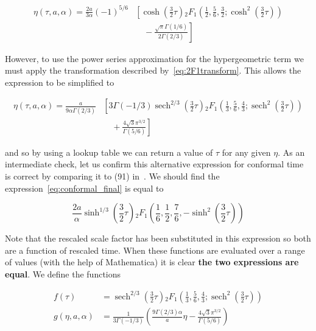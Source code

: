 \documentclass[preprint,notitlepage,amsmath,amssymb,floatfix]{revtex4-1}
\DeclareMathOperator{\sech}{sech}
\begin{document}
\begin{equation}
\begin{split}
\eta\left(\tau, a, \alpha\right) = \frac{2a}{3\alpha}\left(-1\right)^{5/6}&\left[\cosh\left(\frac{3}{2}\tau\right) {}_2F_1\left(\frac{1}{2},\frac{5}{6},\frac{3}{2};\cosh^2\left(\frac{3}{2}\tau\right)\right)\right. \\
& \quad - \left.\frac{\sqrt{\pi}\Gamma\left(1/6\right)}{2\Gamma\left(2/3\right)}\right]
\end{split}
\end{equation}

\noindent However, to use the power series approximation for the hypergeometric term we must apply the transformation described by~\eqref{eq:2F1transform}.
This allows the expression to be simplified to

\begin{equation}
\begin{split}
\label{eq:conformal_final}
\eta\left(\tau, a, \alpha\right) = \frac{a}{9\alpha\Gamma\left(2/3\right)}&\left[3\Gamma\left(-1/3\right)\sech^{2/3}\left(\frac{3}{2}\tau\right) {}_2F_1\left(\frac{1}{3},\frac{5}{6},\frac{4}{3};\sech^2\left(\frac{3}{2}\tau\right)\right)\right. \\
& \quad + \left.\frac{4\sqrt{3}\pi^{3/2}}{\Gamma\left(5/6\right)}\right]
\end{split}
\end{equation}

\noindent and so by using a lookup table we can return a value of $\tau$ for any given $\eta$.  
As an intermediate check, let us confirm this alternative expression for conformal time is correct by comparing it to (91) in~\cite{ref:snc2012}.
We should find the expression~\eqref{eq:conformal_final} is equal to

\begin{equation}
\frac{2a}{\alpha}\sinh^{1/3}\left(\frac{3}{2}\tau\right) {}_2F_1\left(\frac{1}{6},\frac{1}{2},\frac{7}{6},-\sinh^2\left(\frac{3}{2}\tau\right)\right)
\end{equation}

\noindent Note that the rescaled scale factor has been substituted in this expression so both are a function of rescaled time.
When these functions are evaluated over a range of values (with the help of Mathematica) it is clear \textbf{the two expressions are equal}.
We define the functions

\begin{align}
f\left(\tau\right) &= \sech^{2/3}\left(\frac{3}{2}\tau\right) {}_2F_1\left(\frac{1}{3},\frac{5}{6},\frac{4}{3};\sech^2\left(\frac{3}{2}\tau\right)\right) \\
g\left(\eta, a, \alpha\right) &= \frac{1}{3\Gamma\left(-1/3\right)}\left(\frac{9\Gamma\left(2/3\right)\alpha}{a}\eta - \frac{4\sqrt{3}\pi^{3/2}}{\Gamma\left(5/6\right)}\right)
\end{align}
\end{document}
